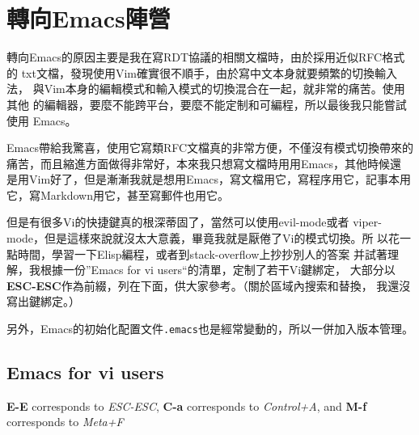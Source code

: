 
\usepackage[UTF8, heading = false, scheme = plain]{ctex}


\part{轉向Emacs陣營}
\label{轉向emacs陣營}

轉向Emacs的原因主要是我在寫RDT協議的相關文檔時，由於採用近似RFC格式的
txt文檔，發現使用Vim確實很不順手，由於寫中文本身就要頻繁的切換輸入法，
與Vim本身的編輯模式和輸入模式的切換混合在一起，就非常的痛苦。使用其他
的編輯器，要麼不能跨平台，要麼不能定制和可編程，所以最後我只能嘗試使用
Emacs。 

Emacs帶給我驚喜，使用它寫類RFC文檔真的非常方便，不僅沒有模式切換帶來的
痛苦，而且縮進方面做得非常好，本來我只想寫文檔時用用Emacs，其他時候還
是用Vim好了，但是漸漸我就是想用Emacs，寫文檔用它，寫程序用它，記事本用
它，寫Markdown用它，甚至寫郵件也用它。

但是有很多Vi的快捷鍵真的根深蒂固了，當然可以使用evil-mode或者
viper-mode，但是這樣來說就沒太大意義，畢竟我就是厭倦了Vi的模式切換。所
以花一點時間，學習一下Elisp編程，或者到stack-overflow上抄抄別人的答案
并試著理解，我根據一份”Emacs for vi users“的清單，定制了若干Vi鍵綁定，
大部分以\textbf{ESC-ESC}作為前綴，列在下面，供大家參考。（關於區域內搜索和替換，
我還沒寫出鍵綁定。）

另外，Emacs的初始化配置文件\texttt{.emacs}也是經常變動的，所以一併加入版本管理。

\chapter{Emacs for vi users}
\label{emacsforviusers}

\textbf{E-E} corresponds to \emph{ESC-ESC}, \textbf{C-a} corresponds to \emph{Control+A}, and \textbf{M-f} corresponds to \emph{Meta+F}

